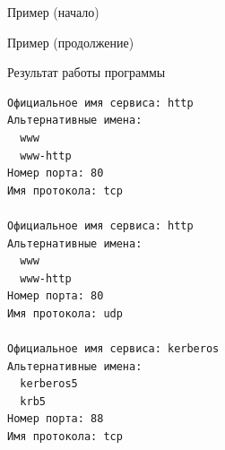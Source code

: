\begin{frame}[fragile]{Пример (начало)}
\tiny
\end{frame}

\begin{frame}[fragile]{Пример (продолжение)}
\tiny
\end{frame}

\begin{frame}[fragile]{Результат работы программы}
\scriptsize\begin{verbatim}
Официальное имя сервиса: http
Альтернативные имена:
  www
  www-http
Номер порта: 80
Имя протокола: tcp

Официальное имя сервиса: http
Альтернативные имена:
  www
  www-http
Номер порта: 80
Имя протокола: udp

Официальное имя сервиса: kerberos
Альтернативные имена:
  kerberos5
  krb5
Номер порта: 88
Имя протокола: tcp
\end{verbatim}
\end{frame}

